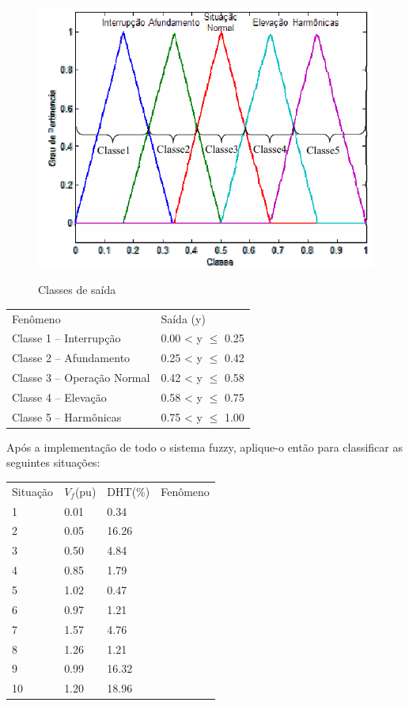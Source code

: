 \documentclass{report}
\begin{document}
\begin{figure}[hptb]
\centering
\includegraphics[scale=.6]{classe.png}
\label{esquematico}
\caption{Classes de saída}
\end{figure}


\begin{center}
\begin{tabular}{ll}
Fenômeno & Saída (y)\\
Classe 1 – Interrupção & 0.00 < y $\leq$ 0.25 \\
Classe 2 – Afundamento & 0.25 < y $\leq$ 0.42 \\
Classe 3 – Operação Normal & 0.42 < y $\leq$ 0.58 \\
Classe 4 – Elevação & 0.58 < y $\leq$ 0.75 \\
Classe 5 – Harmônicas & 0.75 < y $\leq$ 1.00
\end{tabular}
\end{center}




Após a implementação de todo o sistema fuzzy, aplique-o então para classificar as
seguintes situações:


\begin{center}
\begin{tabular}{llll}
Situação & $V_f$(pu) & DHT(\%) & Fenômeno \\
1 & 0.01 & 0.34 & \\
2 & 0.05 & 16.26 & \\
3 & 0.50 & 4.84 & \\
4 & 0.85 & 1.79 & \\
5 & 1.02 & 0.47 & \\
6 & 0.97 & 1.21 & \\
7 & 1.57 & 4.76 & \\
8 & 1.26 & 1.21 & \\
9 & 0.99 & 16.32 & \\
10 & 1.20 & 18.96 &
\end{tabular}
\end{center}


\newpage
% 
\end{document}

